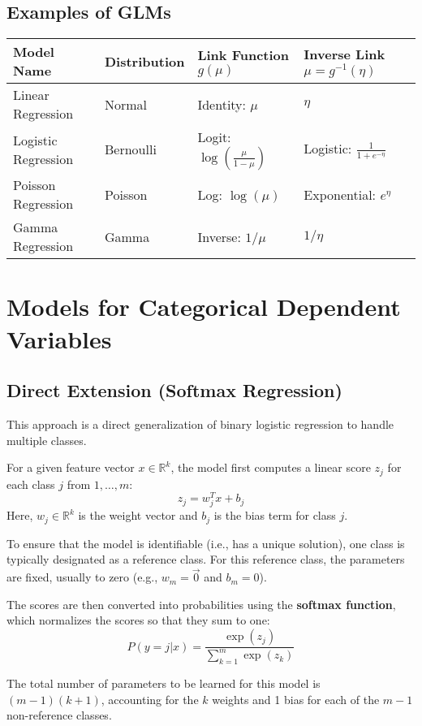 \documentclass{article}
\begin{document}
\begin{multicols}{2}
\subsection{Examples of GLMs}
\begin{table}[h!]
\centering
\begin{tabular}{|l|l|l|l|}
\hline
\textbf{Model Name} & \textbf{Distribution} & \textbf{Link Function $g(\mu)$} & \textbf{Inverse Link $\mu = g^{-1}(\eta)$} \\
\hline
Linear Regression & Normal & Identity: $\mu$ & $\eta$ \\
Logistic Regression & Bernoulli & Logit: $\log(\frac{\mu}{1-\mu})$ & Logistic: $\frac{1}{1+e^{-\eta}}$ \\
Poisson Regression & Poisson & Log: $\log(\mu)$ & Exponential: $e^{\eta}$ \\
Gamma Regression & Gamma & Inverse: $1/\mu$ & $1/\eta$ \\
\hline
\end{tabular}
\end{table}

\section{Models for Categorical Dependent Variables}

\subsection{Direct Extension (Softmax Regression)}
This approach is a direct generalization of binary logistic regression to handle multiple classes.

For a given feature vector $x \in \mathbb{R}^k$, the model first computes a linear score $z_j$ for each class $j$ from $1, \dots, m$:
$$ z_j = w_j^T x + b_j $$
Here, $w_j \in \mathbb{R}^k$ is the weight vector and $b_j$ is the bias term for class $j$.

To ensure that the model is identifiable (i.e., has a unique solution), one class is typically designated as a reference class. For this reference class, the parameters are fixed, usually to zero (e.g., $w_m = \vec{0}$ and $b_m = 0$).

The scores are then converted into probabilities using the \textbf{softmax function}, which normalizes the scores so that they sum to one:
$$ P(y=j | x) = \frac{\exp(z_j)}{\sum_{k=1}^{m} \exp(z_k)} $$

The total number of parameters to be learned for this model is $(m-1)(k+1)$, accounting for the $k$ weights and 1 bias for each of the $m-1$ non-reference classes.


\end{multicols}
\end{document}
